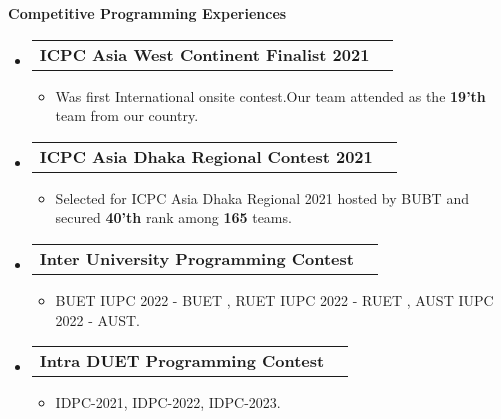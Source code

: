 \documentclass[legalpaper,10pt]{article}
\makeatletter
\newcommand{\resheading}[1]{{\large \colorbox{mygrey}{\begin{minipage}{\textwidth}{\textbf{#1 \vphantom{p\^{E}}}}\end{minipage}}}}
\newcommand{\ressubheading}[4]{
	\begin{tabular*}{7.1in}{l@{\extracolsep{\fill}}r}
		\textbf{#1} & \textit{#4} \\
	\end{tabular*}\vspace{-6pt}}
\makeatother
\begin{document}
        \resheading{Competitive Programming Experiences}
	\begin{itemize}

            \item \ressubheading{ICPC Asia West Continent Finalist 2021}{}{}{}
            \begin{itemize}
		    \item Was first International onsite contest.Our team attended as the \textbf{19'th} team from our country.
		\end{itemize}
             \item \ressubheading{ICPC Asia Dhaka Regional Contest 2021}{}{}{}
             \begin{itemize}
		    \item  Selected for ICPC Asia Dhaka Regional 2021 hosted by BUBT and secured \textbf{40'th} rank among \textbf{165} teams.
		\end{itemize}
            \item \ressubheading{Inter University Programming Contest}{}{}{}
             \begin{itemize}
		    \item BUET IUPC 2022 - BUET ,  RUET IUPC 2022 - RUET , AUST IUPC 2022 - AUST.
		\end{itemize}
  
            \item \ressubheading{Intra DUET Programming Contest}{}{}{}
             \begin{itemize}
		    \item IDPC-2021, IDPC-2022, IDPC-2023.
		\end{itemize}
            
	\end{itemize}

        \vspace{0.15in}
	
\end{document}
